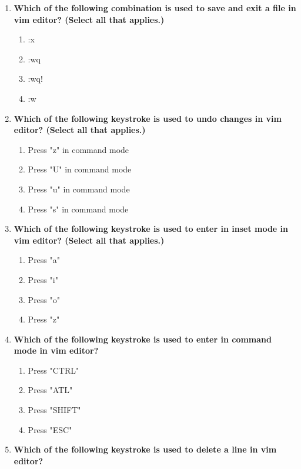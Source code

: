 \begin{flushleft}
	\begin{enumerate}
		\item \textbf{Which of the following combination is used to save and exit a file in vim editor? (Select all that applies.)}
		\begin{enumerate}[label=(\alph*)]
			\item :x       %
			\item :wq      %
			\item :wq!                  %
			\item :w
		\end{enumerate}
		\bigskip
		\bigskip
		\item \textbf{Which of the following keystroke is used to undo changes in vim editor? (Select all that applies.)}
		\begin{enumerate}[label=(\alph*)]
			\item Press "z" in command mode      
			\item Press "U" in command mode    %
			\item Press "u" in command mode   %
			\item Press "s" in command mode
		\end{enumerate}
		\bigskip
		\bigskip
		\item \textbf{Which of the following keystroke is used to enter in \textbf{inset mode} in vim editor? (Select all that applies.)}
		\begin{enumerate}[label=(\alph*)]
			\item Press "a" %
			\item Press "i" %
			\item Press "o" %
			\item Press "z"
		\end{enumerate}
		\bigskip
		\bigskip
		\item \textbf{Which of the following keystroke is used to enter in \textbf{command mode} in vim editor?}
		\begin{enumerate}[label=(\alph*)]
			\item Press "CTRL"
			\item Press "ATL"
			\item Press "SHIFT"
			\item Press "ESC"  %
		\end{enumerate}
		\bigskip
		\bigskip
		\item \textbf{Which of the following keystroke is used to delete a line in vim editor?}
		\begin{enumerate}[label=(\alph*)]

\end{enumerate}
\end{enumerate}
\end{flushleft}
